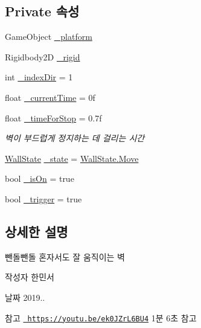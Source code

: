 \subsection*{Private 속성}
\begin{DoxyCompactItemize}
\item 
Game\+Object \mbox{\hyperlink{class_moving_platform_ac506246414b03f4f35d462f324c18ffc}{\+\_\+platform}}
\item 
Rigidbody2D \mbox{\hyperlink{class_moving_platform_a420854da980550fe82c4f82f46ecd41e}{\+\_\+rigid}}
\item 
int \mbox{\hyperlink{class_moving_platform_a885973335ac91f8c34289d38f2d88d93}{\+\_\+index\+Dir}} = 1
\item 
float \mbox{\hyperlink{class_moving_platform_a5c9c4e39da03c1aef1abde75a137831c}{\+\_\+current\+Time}} = 0f
\item 
float \mbox{\hyperlink{class_moving_platform_a69791dc347a05d5513e82cd445640cf4}{\+\_\+time\+For\+Stop}} = 0.\+7f
\begin{DoxyCompactList}\small\item\em 벽이 부드럽게 정지하는 데 걸리는 시간 \end{DoxyCompactList}\item 
\mbox{\hyperlink{class_moving_platform_ac47e764b71989317aab0bad26d82a901}{Wall\+State}} \mbox{\hyperlink{class_moving_platform_abd03a1d4800fd5fa8ab4ef8ce5a688db}{\+\_\+state}} = \mbox{\hyperlink{class_moving_platform_ac47e764b71989317aab0bad26d82a901a6bc362dbf494c61ea117fe3c71ca48a5}{Wall\+State.\+Move}}
\item 
bool \mbox{\hyperlink{class_moving_platform_a6721f91607e56294fb807a00ccfaafad}{\+\_\+is\+On}} = true
\item 
bool \mbox{\hyperlink{class_moving_platform_a98e69f4b8bfe702ef2bc6a8d77a03b8a}{\+\_\+trigger}} = true
\end{DoxyCompactItemize}


\subsection{상세한 설명}
뺀돌뺀돌 혼자서도 잘 움직이는 벽 

\begin{DoxyAuthor}{작성자}
한민서 
\end{DoxyAuthor}
\begin{DoxyDate}{날짜}
2019.. 
\end{DoxyDate}
\begin{DoxySeeAlso}{참고}
\href{https://youtu.be/ek0JZrL6BU4}{\texttt{ https\+://youtu.\+be/ek0\+J\+Zr\+L6\+B\+U4}} 1분 6초 참고 
\end{DoxySeeAlso}


